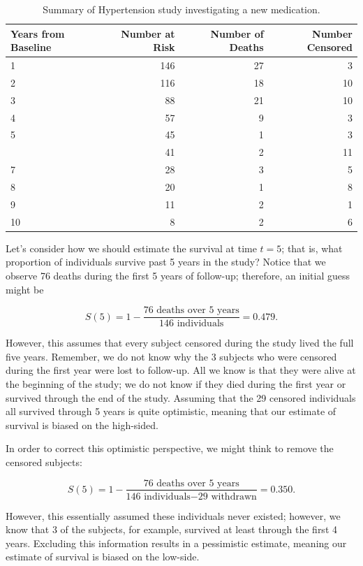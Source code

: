 \documentclass[
]{book}
\theoremstyle{plain}
\theoremstyle{mydefn}
\theoremstyle{myexmpl}
\theoremstyle{remark}
\begin{document}
\begin{table}

\caption{\label{tab:surv-hypertension-data}Summary of Hypertension study investigating a new medication.}
\centering
\begin{tabular}[t]{lrrr}
\toprule
Years from Baseline & Number at Risk & Number of Deaths & Number Censored\\
\midrule
1 & 146 & 27 & 3\\
2 & 116 & 18 & 10\\
3 & 88 & 21 & 10\\
4 & 57 & 9 & 3\\
5 & 45 & 1 & 3\\
\addlinespace
6 & 41 & 2 & 11\\
7 & 28 & 3 & 5\\
8 & 20 & 1 & 8\\
9 & 11 & 2 & 1\\
10 & 8 & 2 & 6\\
\bottomrule
\end{tabular}
\end{table}

Let's consider how we should estimate the survival at time \(t = 5\); that is, what proportion of individuals survive past 5 years in the study? Notice that we observe 76 deaths during the first 5 years of follow-up; therefore, an initial guess might be

\[S(5) = 1 - \frac{\text{76 deaths over 5 years}}{\text{146 individuals}} = 0.479.\]

However, this assumes that every subject censored during the study lived the full five years. Remember, we do not know why the 3 subjects who were censored during the first year were lost to follow-up. All we know is that they were alive at the beginning of the study; we do not know if they died during the first year or survived through the end of the study. Assuming that the 29 censored individuals all survived through 5 years is quite optimistic, meaning that our estimate of survival is biased on the high-sided.

In order to correct this optimistic perspective, we might think to remove the censored subjects:

\[S(5) = 1 - \frac{\text{76 deaths over 5 years}}{\text{146 individuals} - \text{29 withdrawn}} = 0.350.\]

However, this essentially assumed these individuals never existed; however, we know that 3 of the subjects, for example, survived at least through the first 4 years. Excluding this information results in a pessimistic estimate, meaning our estimate of survival is biased on the low-side.
\end{document}

